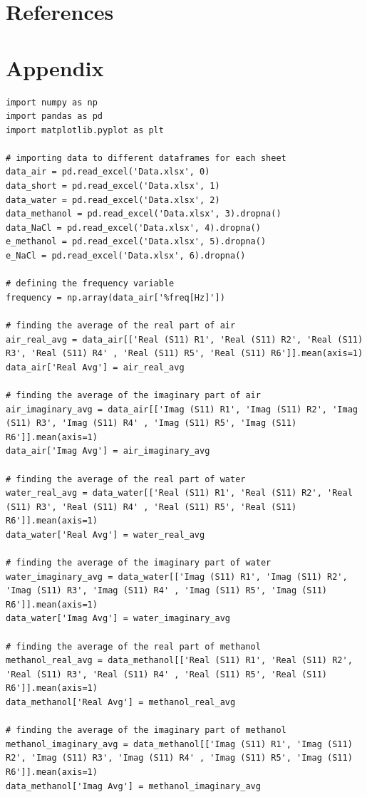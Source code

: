 \documentclass[12pt, a4paper]{article}
\begin{document}
\section{References}
\printbibliography[heading = none]

\section{Appendix}
\begin{verbatim}
import numpy as np
import pandas as pd
import matplotlib.pyplot as plt

# importing data to different dataframes for each sheet
data_air = pd.read_excel('Data.xlsx', 0)
data_short = pd.read_excel('Data.xlsx', 1)
data_water = pd.read_excel('Data.xlsx', 2)
data_methanol = pd.read_excel('Data.xlsx', 3).dropna()
data_NaCl = pd.read_excel('Data.xlsx', 4).dropna()
e_methanol = pd.read_excel('Data.xlsx', 5).dropna()
e_NaCl = pd.read_excel('Data.xlsx', 6).dropna()

# defining the frequency variable
frequency = np.array(data_air['%freq[Hz]'])

# finding the average of the real part of air
air_real_avg = data_air[['Real (S11) R1', 'Real (S11) R2', 'Real (S11) R3', 'Real (S11) R4' , 'Real (S11) R5', 'Real (S11) R6']].mean(axis=1)
data_air['Real Avg'] = air_real_avg

# finding the average of the imaginary part of air
air_imaginary_avg = data_air[['Imag (S11) R1', 'Imag (S11) R2', 'Imag (S11) R3', 'Imag (S11) R4' , 'Imag (S11) R5', 'Imag (S11) R6']].mean(axis=1)
data_air['Imag Avg'] = air_imaginary_avg

# finding the average of the real part of water
water_real_avg = data_water[['Real (S11) R1', 'Real (S11) R2', 'Real (S11) R3', 'Real (S11) R4' , 'Real (S11) R5', 'Real (S11) R6']].mean(axis=1)
data_water['Real Avg'] = water_real_avg

# finding the average of the imaginary part of water
water_imaginary_avg = data_water[['Imag (S11) R1', 'Imag (S11) R2', 'Imag (S11) R3', 'Imag (S11) R4' , 'Imag (S11) R5', 'Imag (S11) R6']].mean(axis=1)
data_water['Imag Avg'] = water_imaginary_avg

# finding the average of the real part of methanol
methanol_real_avg = data_methanol[['Real (S11) R1', 'Real (S11) R2', 'Real (S11) R3', 'Real (S11) R4' , 'Real (S11) R5', 'Real (S11) R6']].mean(axis=1)
data_methanol['Real Avg'] = methanol_real_avg

# finding the average of the imaginary part of methanol
methanol_imaginary_avg = data_methanol[['Imag (S11) R1', 'Imag (S11) R2', 'Imag (S11) R3', 'Imag (S11) R4' , 'Imag (S11) R5', 'Imag (S11) R6']].mean(axis=1)
data_methanol['Imag Avg'] = methanol_imaginary_avg


\end{verbatim}
\end{document}
